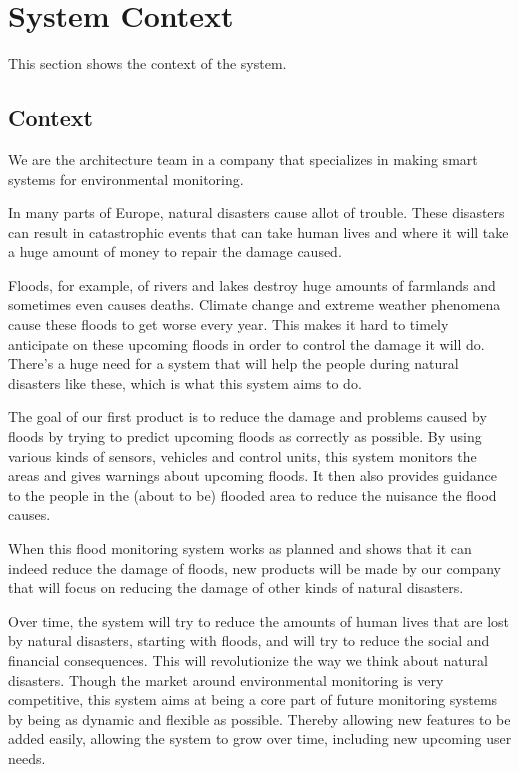 \chapter{System Context}
\label{ch:context}

This section shows the context of the system.

\section{Context}
We are the architecture team in a company that specializes in making smart systems for environmental monitoring.

In many parts of Europe, natural disasters cause allot of trouble. These disasters can result in catastrophic events that can take human lives and where it will take a huge amount of money to repair the damage caused.

Floods, for example, of rivers and lakes destroy huge amounts of farmlands and sometimes even causes deaths. Climate change and extreme weather phenomena cause these floods to get worse every year. This makes it hard to timely anticipate on these upcoming floods in order to control the damage it will do. There's a huge need for a system that will help the people during natural disasters like these, which is what this system aims to do.

The goal of our first product is to reduce the damage and problems caused by floods by trying to predict upcoming floods as correctly as possible. By using various kinds of sensors, vehicles and control units, this system monitors the areas and gives warnings about upcoming floods. It then also provides guidance to the people in the (about to be) flooded area to reduce the nuisance the flood causes.

When this flood monitoring system works as planned and shows that it can indeed reduce the damage of floods, new products will be made by our company that will focus on reducing the damage of other kinds of natural disasters.

Over time, the system will try to reduce the amounts of human lives that are lost by natural disasters, starting with floods, and will try to reduce the social and financial consequences. This will revolutionize the way we think about natural disasters. Though the market around environmental monitoring is very competitive, this system aims at being a core part of future monitoring systems by being as dynamic and flexible as possible. Thereby allowing new features to be added easily, allowing the system to grow over time, including new upcoming user needs.